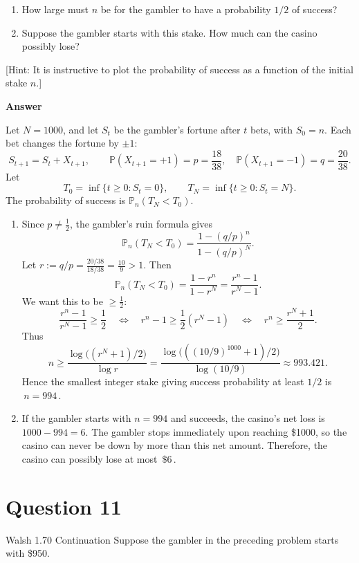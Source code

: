 \documentclass[letterpaper]{article}
\begin{document}
\begin{enumerate}
\item[(a)] How large must $n$ be for the gambler to have a probability $1/2$ of success?
\item[(b)] Suppose the gambler starts with this stake. How much can the casino possibly lose?
\end{enumerate}

[Hint: It is instructive to plot the probability of success as a function of the initial stake $n$.]

\textbf{Answer}

Let $N=1000$, and let $S_t$ be the gambler's fortune after $t$ bets, with
$S_0=n$. Each bet changes the fortune by $\pm 1$:
\[
S_{t+1}=S_t+X_{t+1},\qquad 
\mathbb{P}(X_{t+1}=+1)=p=\frac{18}{38},\quad 
\mathbb{P}(X_{t+1}=-1)=q=\frac{20}{38}.
\]
Let
\[
T_0=\inf\{t\ge0:S_t=0\},\qquad T_N=\inf\{t\ge0:S_t=N\}.
\]
The probability of success is $\mathbb{P}_n(T_N<T_0)$.

\begin{enumerate}
	\item[(a)] Since $p\neq \frac12$, the gambler's ruin formula gives
	\[
	\mathbb{P}_n(T_N<T_0)=\frac{1-(q/p)^n}{1-(q/p)^N}.
	\]
	Let $r:=q/p=\frac{20/38}{18/38}=\frac{10}{9}>1$. Then
	\[
	\mathbb{P}_n(T_N<T_0)=\frac{1-r^n}{1-r^N}=\frac{r^n-1}{r^N-1}.
	\]
	We want this to be $\ge \frac12$:
	\[
	\frac{r^n-1}{r^N-1}\ge \frac12
	\quad\Longleftrightarrow\quad
	r^n-1\ge \frac12(r^N-1)
	\quad\Longleftrightarrow\quad
	r^n\ge \frac{r^N+1}{2}.
	\]
	Thus
	\[
	n\ge \frac{\log\!\bigl((r^N+1)/2\bigr)}{\log r}
	=\frac{\log\!\bigl(((10/9)^{1000}+1)/2\bigr)}{\log(10/9)}
	\approx 993.421.
	\]
	Hence the smallest integer stake giving success probability at least $1/2$ is $
	{\,n=994\,}.$
	
	\item[(b)] If the gambler starts with $n=994$ and succeeds, the casino's net loss is
	$
	1000-994=6.
	$
	The gambler stops immediately upon reaching \$1000, so the casino can never be down
	by more than this net amount. Therefore, the casino can possibly lose at most
	$
	{\,\$6\,}.
	$
\end{enumerate}


\clearpage
		
		\section{Question 11}
		
		{\color{deepred} Walsh 1.70 Continuation} Suppose the gambler in the preceding problem starts with \$950.
	
\end{document}
